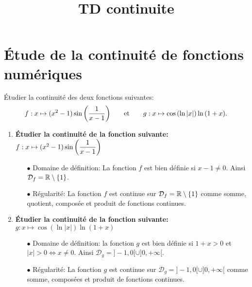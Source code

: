 \documentclass[a4paper, 11pt,reqno]{article}
\begin{document}
\title{TD continuite}


\noindent\section{\large{\'Etude de la continuit\'e de fonctions num\'eriques}}


\begin{exercice}  \;
	\'Etudier la continuit\'e des deux fonctions suivantes:
	$$
		f: x\mapsto (x^2-1)\sin{\left( \displaystyle\frac{1}{x-1} \right)}\qquad \hbox{et}\qquad g: x\mapsto \cos{(\ln{|x|})}\ln{(1+x)}.
	$$
\end{exercice}
\begin{correction}  \;
	\begin{enumerate}
		\item \textbf{\'Etudier la continuit\'e de la fonction suivante: $f: x\mapsto (x^2-1)\sin{\left( \displaystyle\frac{1}{x-1} \right)}$}\\
		      \begin{itemize}
			      \item[$\bullet$] Domaine de d\'efinition: La fonction $f$ est bien d\'efinie si $x-1\not= 0$. Ainsi $\mathcal{D}_f=\mathbb{R}\setminus\lbrace 1\rbrace$.
			      \item[$\bullet$] R\'egularit\'e: La fonction $f$ est continue sur $\mathcal{D}_f=\mathbb{R}\setminus\lbrace 1\rbrace$ comme somme, quotient, compos\'ee et produit de fonctions continues.
		      \end{itemize}
		\item \textbf{\'Etudier la continuit\'e de la fonction suivante: $g: x\mapsto \cos{(\ln{|x|})}\ln{(1+x)}$}\\
		      \begin{itemize}
			      \item[$\bullet$] Domaine de d\'efinition: la fonction $g$ est bien d\'efinie si $1+x>0$ et $|x|>0\Leftrightarrow x\not= 0$. Ainsi $\mathcal{D}_g=\rbrack -1,0\lbrack \cup \rbrack 0,+\infty\lbrack$.
			      \item[$\bullet$] R\'egularit\'e: La fonction $g$ est continue sur $\mathcal{D}_g=\rbrack -1,0\lbrack \cup \rbrack 0,+\infty\lbrack$ comme somme, compos\'ees et produit de fonctions continues.
		      \end{itemize}
	\end{enumerate}
\end{correction}
\end{document}
